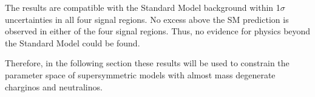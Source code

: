 The results are compatible with the Standard Model background within 1$\sigma$ uncertainties in all four signal regions.
No excess above the SM prediction is observed in either of the four signal regions.
Thus, no evidence for physics beyond the Standard Model could be found.

Therefore, in the following section these results will be used to constrain the parameter space of supersymmetric models with almost mass degenerate charginos and neutralinos.


